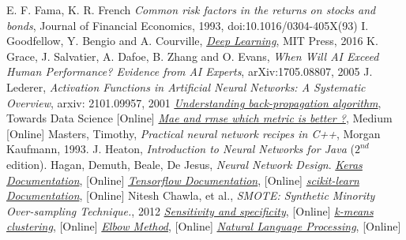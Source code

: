 \begin{thebibliography}{9}
 E. F. Fama, K. R. French \emph{Common risk factors in the returns on stocks and bonds}, Journal of Financial Economics, 1993, doi:10.1016/0304-405X(93)
 I. Goodfellow, Y. Bengio and A. Courville, \href{http://www.deeplearningbook.org}{\emph{Deep Learning}}, MIT Press, 2016
K. Grace, J. Salvatier, A. Dafoe, B. Zhang and O. Evans, \emph{When Will AI Exceed Human Performance? Evidence from AI Experts}, arXiv:1705.08807, 2005
 J. Lederer, \emph{Activation Functions in Artificial Neural Networks: A Systematic Overview}, arxiv: 2101.09957, 2001
\href{https://towardsdatascience.com/understanding-backpropagation-algorithm-7bb3aa2f95fd}{\emph{Understanding back-propagation algorithm}}, Towards Data Science [Online]
\href{https://medium.com/human-in-a-machine-world/mae-and-rmse-which-metric-is-better-e60ac3bde13d}{\emph{Mae and rmse which metric is better ?}}, Medium [Online]
 Masters, Timothy, \emph{Practical neural network recipes in C++}, Morgan Kaufmann, 1993.
 J. Heaton, \emph{Introduction to Neural Networks for Java} ($2^{nd}$ edition).
 Hagan, Demuth, Beale, De Jesus, \emph{Neural Network Design}.
\href{https://keras.io/}{\emph{Keras Documentation}}, [Online]  
\href{https://www.tensorflow.org/}{\emph{Tensorflow Documentation}}, [Online] 
\href{https://scikit-learn.org/stable/}{\emph{scikit-learn Documentation}}, [Online]
Nitesh Chawla, et al., \emph{SMOTE: Synthetic Minority Over-sampling Technique.}, 2012
\href{https://en.wikipedia.org/wiki/Sensitivity_and_specificity}{\emph{Sensitivity and specificity}}, [Online]
\href{https://en.wikipedia.org/wiki/K-means_clustering}{\emph{k-means clustering}}, [Online]
\href{https://en.wikipedia.org/wiki/Elbow_method_(clustering)}{\emph{Elbow Method}}, [Online]
\href{https://www.ibm.com/cloud/learn/natural-language-processing}{\emph{Natural Language Processing}}, [Online]
\end{thebibliography}
